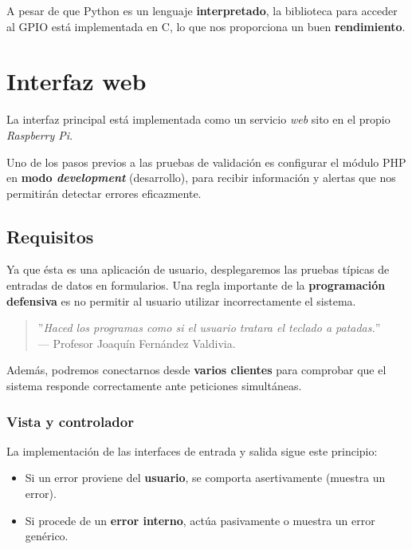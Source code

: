 A pesar de que Python es un lenguaje \textbf{interpretado}, la biblioteca para acceder al \acrshort{GPIO} está implementada en C, lo que nos proporciona un buen \textbf{rendimiento}.

\newpage

\section{Interfaz web}

La interfaz principal está implementada como un servicio \textit{web} sito en el propio \textit{Raspberry Pi}. 

Uno de los pasos previos a las pruebas de validación es configurar el módulo \acrshort{PHP} en \textbf{modo \textit{development}} (desarrollo), para recibir información y alertas que nos permitirán detectar errores eficazmente.

\subsection{Requisitos}

Ya que ésta es una aplicación de usuario, desplegaremos las pruebas típicas de entradas de datos en formularios. Una regla importante de la \textbf{programación defensiva} es no permitir al usuario utilizar incorrectamente el sistema.

\smallskip

\begin{quote}
	\small \flushright ''\textit{Haced los programas como si el usuario tratara el teclado a patadas.}'' \\
	--- Profesor Joaquín Fernández Valdivia.
\end{quote}

\smallskip

Además, podremos conectarnos desde \textbf{varios clientes} para comprobar que el sistema responde correctamente ante peticiones simultáneas.

\subsubsection{Vista y controlador}

La implementación de las interfaces de entrada y salida sigue este principio:

\begin{itemize}
	\item Si un error proviene del \textbf{usuario}, se comporta asertivamente (muestra un error).
	\item Si procede de un \textbf{error interno}, actúa pasivamente o muestra un error genérico.
\end{itemize}

